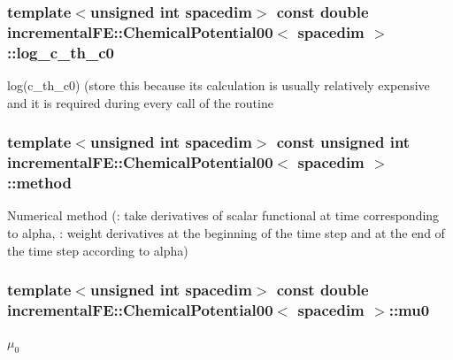 \subsubsection[{\texorpdfstring{log\+\_\+c\+\_\+th\+\_\+c0}{log_c_th_c0}}]{\setlength{\rightskip}{0pt plus 5cm}template$<$unsigned int spacedim$>$ const double {\bf incremental\+F\+E\+::\+Chemical\+Potential00}$<$ spacedim $>$\+::log\+\_\+c\+\_\+th\+\_\+c0\hspace{0.3cm}{\ttfamily [private]}}\hypertarget{classincremental_f_e_1_1_chemical_potential00_ac3da130e727c8a08f7616cf01c4a2826}{}\label{classincremental_f_e_1_1_chemical_potential00_ac3da130e727c8a08f7616cf01c4a2826}
log(c\+\_\+th\+\_\+c0) (store this because its calculation is usually relatively expensive and it is required during every call of the routine 
\subsubsection[{\texorpdfstring{method}{method}}]{\setlength{\rightskip}{0pt plus 5cm}template$<$unsigned int spacedim$>$ const unsigned int {\bf incremental\+F\+E\+::\+Chemical\+Potential00}$<$ spacedim $>$\+::method\hspace{0.3cm}{\ttfamily [private]}}\hypertarget{classincremental_f_e_1_1_chemical_potential00_ac264752dace0c782bf4c1fe5d620e6dc}{}\label{classincremental_f_e_1_1_chemical_potential00_ac264752dace0c782bf4c1fe5d620e6dc}
Numerical method ({}\+: take derivatives of scalar functional at time corresponding to {\ttfamily alpha}, {}\+: weight derivatives at the beginning of the time step and at the end of the time step according to {\ttfamily alpha}) 
\subsubsection[{\texorpdfstring{mu0}{mu0}}]{\setlength{\rightskip}{0pt plus 5cm}template$<$unsigned int spacedim$>$ const double {\bf incremental\+F\+E\+::\+Chemical\+Potential00}$<$ spacedim $>$\+::mu0\hspace{0.3cm}{\ttfamily [private]}}\hypertarget{classincremental_f_e_1_1_chemical_potential00_a64b01fb87580d416b201175e7e819bcb}{}\label{classincremental_f_e_1_1_chemical_potential00_a64b01fb87580d416b201175e7e819bcb}
$\mu_0$ 
